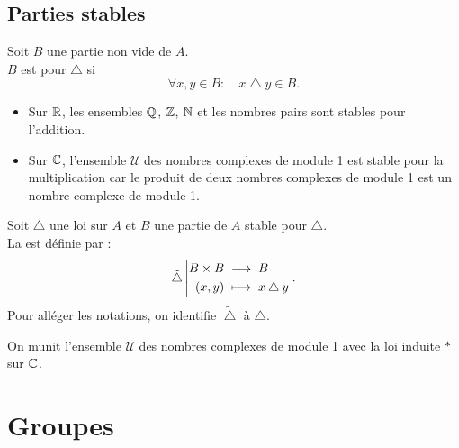 \documentclass{book}
\begin{document}
\subsection{Parties stables}
\begin{Definition}
Soit $B$ une partie non vide de $A$.\\
$B$ est  pour $\bigtriangleup$ si  
$$\forall x, y \in B :\quad   x \bigtriangleup y \in B.$$
\end{Definition}
\begin{Exemple}
\begin{itemize}
\item Sur $\mathbb{R}$, les ensembles $\mathbb{Q}$, $\mathbb{Z}$, $\mathbb{N}$ et les nombres pairs sont stables pour l'addition. 
\item Sur $\mathbb{C}$, l'ensemble $ \mathcal{U}$ des nombres complexes de module 1 est stable pour la multiplication car le produit de deux nombres
complexes de module 1 est un nombre complexe de module 1.
\end{itemize}
\end{Exemple}
\begin{Definition}
Soit $\bigtriangleup$ une loi sur $A$ et $B$ une partie de $A$ stable pour $\bigtriangleup$.\\
La  est définie par  :
$$ {\tilde{\bigtriangleup}}\left|\begin{aligned}{B\times B}&\;\longrightarrow\;{B}\\{(x,y)}&\;\longmapsto\;{x \bigtriangleup y}\end{aligned}\right..$$
Pour alléger les notations, on identifie $\tilde{\bigtriangleup}$ à $\bigtriangleup$. 
\end{Definition}
\begin{Exemple}On munit  l'ensemble $ \mathcal{U}$ des nombres complexes de module 1 avec la loi induite $*$ sur $\mathbb{C}$.
\end{Exemple}
\section{Groupes}
\end{document}
